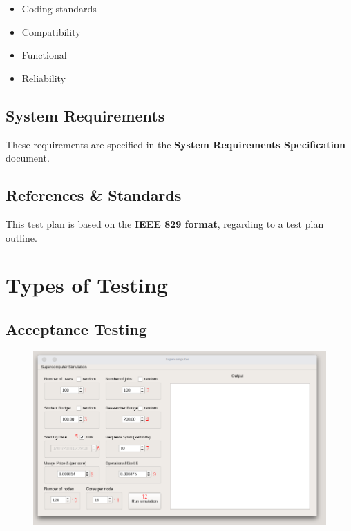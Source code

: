 \documentclass[12pt]{article}
\begin{document}
\begin{itemize}  
\item Coding standards
\item Compatibility 
\item Functional 
\item Reliability
\end{itemize}

\subsection*{System Requirements}

These requirements are specified in the \textbf{System Requirements Specification} document.

\subsection*{References \& Standards}

This test plan is based on the \textbf{IEEE 829 format}, regarding to a test plan outline. 

\pagebreak

\section*{Types of Testing}

\subsection*{Acceptance Testing}

\begin{figure}[!htb]
  \centering
  \includegraphics[width=\linewidth]{GUI.png}
\end{figure}
\end{document}
